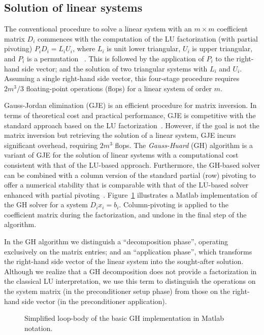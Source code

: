 \subsection{Solution of linear systems}
The conventional procedure to solve a linear system with 
an $m\times m$ coefficient matrix $D_i$
commences with
the computation of the LU factorization (with partial pivoting)
$P_iD_i=L_iU_i$, where $L_i$ is unit lower triangular, $U_i$ is upper triangular, and $P_i$ is a permutation
~\cite{GVL3}. This is followed by the
application of $P_i$ to the right-hand side vector; and the solution
of two triangular systems with $L_i$ and $U_i$.
Assuming a single right-hand side vector, this four-stage procedure requires $2m^3/3$ floating-point operations (flops) for a linear system of order
$m$.

Gauss-Jordan elimination (GJE) is an efficient procedure for matrix inversion.
In terms of theoretical cost and practical performance, GJE is competitive with the standard
approach based on the LU factorization~\cite{doi:10.1137/S1064827598345679,CPE:CPE2933}.
However, if the goal is not the matrix inversion but retrieving the solution of a linear system,
GJE incurs significant overhead, requiring $2m^3$ flops.
The {\it Gauss-Huard} (GH) algorithm is a variant of GJE for the solution of linear systems
with a computational cost consistent with that of the LU-based approach.
Furthermore, the GH-based solver can be combined with a column version of the standard partial (row) pivoting
to offer a numerical stability that is comparable with that of the LU-based solver enhanced with partial pivoting~\cite{Dek97}.
Figure~\ref{2017-gh-block-jacobi:fig:gh} illustrates a Matlab implementation of the GH solver for a system
$D_i x_i = b_i$. 
Column-pivoting is applied to the coefficient matrix during the factorization,
and undone in the final step of the algorithm. 

In the GH algorithm we distinguish a ``decomposition phase'',
operating exclusively on the matrix entries; and an ``application phase'', which transforms the right-hand side 
vector of the linear system into the sought-after solution.
Although we realize that a GH decomposition does not provide a factorization
in the classical LU interpretation,
we use this term to distinguish the operations on the system matrix (in the preconditioner setup phase)
from those on the right-hand side vector (in the preconditioner application).

\begin{figure}
\begin{center}
\begin{minipage}{0.80\columnwidth}

\end{minipage}
\caption{Simplified loop-body of the basic GH implementation in Matlab notation.}
\label{2017-gh-block-jacobi:fig:gh}
\end{center}
\end{figure}

